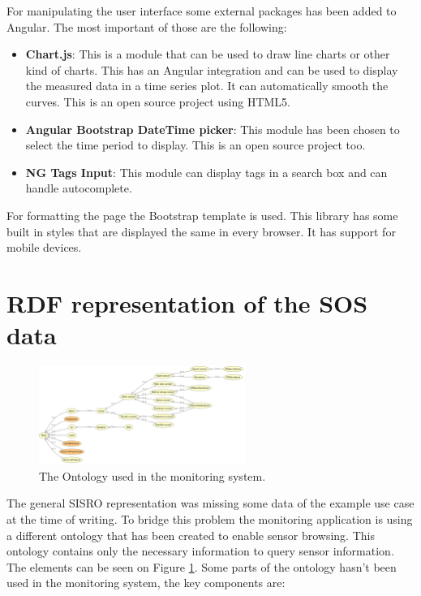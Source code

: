 For manipulating the user interface some external packages has been added to Angular. The most important of those are the following:
\begin{itemize}
\item \textbf{Chart.js}: This is a module that can be used to draw line charts or other kind of charts. This has an Angular integration and can be used to display the measured data in a time series plot. It can automatically smooth the curves. This is an open source project using HTML5.
\item \textbf{Angular Bootstrap DateTime picker}: This module has been chosen to select the time period to display. This is an open source project too.
\item \textbf{NG Tags Input}: This module can display tags in a search box and can handle autocomplete. 
\end{itemize}

For formatting the page the Bootstrap template is used. 
This library has some built in styles that are displayed the same in every browser. It has support for mobile devices.

\section{RDF representation of the SOS data}

\begin{figure}[h]
\centering
\includegraphics[width=0.6\textwidth]{figures/implrdf.png}
\caption{The Ontology used in the monitoring system.\label{fig:implrdf}}
\end{figure}

The general SISRO representation was missing some data of the example use case at the time of writing. To bridge this problem the monitoring application is using a different ontology that has been created to enable sensor browsing. This ontology contains only the necessary information to query sensor information. The elements can be seen on Figure \ref{fig:implrdf}. Some parts of the ontology hasn't been used in the monitoring system, the key components are:

